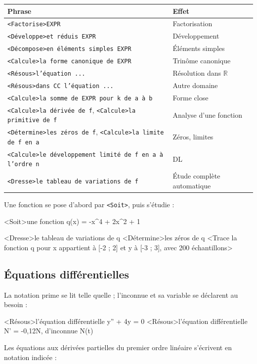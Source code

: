 \documentclass[11pt,a4paper]{article}
\newcommand{\bal}[1]{\texttt{#1}}
\begin{document}
\begin{longtable}{@{}ll@{}}
\toprule
\textbf{Phrase} & \textbf{Effet} \\
\midrule
\bal{<Factorise>EXPR} & Factorisation \\
\bal{<Développe>et réduis EXPR} & Développement \\
\bal{<Décompose>en éléments simples EXPR} & Éléments simples \\
\bal{<Calcule>la forme canonique de EXPR} & Trinôme canonique \\
\bal{<Résous>l'équation ...} & Résolution dans $\mathbb{R}$ \\
\bal{<Résous>dans CC l'équation ...} & Autre domaine \\
\bal{<Calcule>la somme de EXPR pour k de a à b} & Forme close \\
\bal{<Calcule>la dérivée de f}, \bal{<Calcule>la primitive de f} & Analyse d'une fonction \\
\bal{<Détermine>les zéros de f}, \bal{<Calcule>la limite de f en a} & Zéros, limites \\
\bal{<Calcule>le développement limité de f en a à l'ordre n} & DL \\
\bal{<Dresse>le tableau de variations de f} & Étude complète automatique \\
\bottomrule
\end{longtable}

Une fonction se pose d'abord par \bal{<Soit>}, puis s'étudie :

\begin{code}
<Soit>une fonction q(x) = -x^4 + 2x^2 + 1

<Dresse>le tableau de variations de q
<Détermine>les zéros de q
<Trace la fonction q pour x appartient à [-2 ; 2]
    et y à [-3 ; 3], avec 200 échantillons>
\end{code}

\subsection{Équations différentielles}

La notation prime se lit telle quelle ; l'inconnue et sa variable se
déclarent au besoin :

\begin{code}
<Résous>l'équation différentielle y'' + 4y = 0
<Résous>l'équation différentielle N' = -0,12N, d'inconnue N(t)
\end{code}

Les équations aux dérivées partielles du premier ordre linéaire
s'écrivent en notation indicée :
\end{document}
